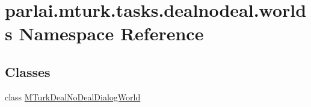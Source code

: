 \hypertarget{namespaceparlai_1_1mturk_1_1tasks_1_1dealnodeal_1_1worlds}{}\section{parlai.\+mturk.\+tasks.\+dealnodeal.\+worlds Namespace Reference}
\label{namespaceparlai_1_1mturk_1_1tasks_1_1dealnodeal_1_1worlds}
\subsection*{Classes}
\begin{DoxyCompactItemize}
\item 
class \hyperlink{classparlai_1_1mturk_1_1tasks_1_1dealnodeal_1_1worlds_1_1MTurkDealNoDealDialogWorld}{M\+Turk\+Deal\+No\+Deal\+Dialog\+World}
\end{DoxyCompactItemize}
